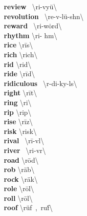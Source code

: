 \documentclass[10pt,a4paper]{article}
\begin{document}
\begin{multicols}{2}
\textbf{ review }\quad \ \textbackslash ri-\textprimstress vy\"{u}\textbackslash \\
\textbf{ revolution }\quad \ \textbackslash \textsecstress re-v\textschwa -\textprimstress l\"{u}-sh\textschwa n\textbackslash \\
\textbf{ reward }\quad \ \textbackslash ri-\textprimstress w\.{o}rd\textbackslash \\
\textbf{ rhythm }\quad \textbackslash \textprimstress ri- h\textschwa m\textbackslash \\
\textbf{ rice }\quad \textbackslash \textprimstress r\={i}s\textbackslash \\
\textbf{ rich }\quad \textbackslash \textprimstress rich\textbackslash \\
\textbf{ rid }\quad \textbackslash \textprimstress rid\textbackslash \\
\textbf{ ride }\quad \textbackslash \textprimstress r\={i}d\textbackslash \\
\textbf{ ridiculous }\quad \ \textbackslash r\textschwa -\textprimstress di-ky\textschwa -l\textschwa s\textbackslash \\
\textbf{ right }\quad \textbackslash \textprimstress r\={i}t\textbackslash \\
\textbf{ ring }\quad \textbackslash \textprimstress ri\engma \textbackslash \\
\textbf{ rip }\quad \textbackslash \textprimstress rip\textbackslash \\
\textbf{ rise }\quad \textbackslash \textprimstress r\={i}z\textbackslash \\
\textbf{ risk }\quad \textbackslash \textprimstress risk\textbackslash \\
\textbf{ rival }\quad \ \textbackslash \textprimstress r\={i}-v\textschwa l\textbackslash \\
\textbf{ river }\quad \ \textbackslash \textprimstress ri-v\textschwa r\textbackslash \\
\textbf{ road }\quad \textbackslash \textprimstress r\={o}d\textbackslash \\
\textbf{ rob }\quad \textbackslash \textprimstress r\"{a}b\textbackslash \\
\textbf{ rock }\quad \textbackslash \textprimstress r\"{a}k\textbackslash \\
\textbf{ role }\quad \textbackslash \textprimstress r\={o}l\textbackslash \\
\textbf{ roll }\quad \textbackslash \textprimstress r\={o}l\textbackslash \\
\textbf{ roof }\quad \textbackslash \textprimstress r\"{u}f\ ,\ \textprimstress ru\. f\textbackslash \\

\end{multicols}
\end{document}

